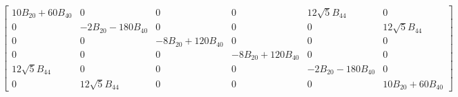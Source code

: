 \documentclass[8pt]{report}
\begin{document}
\begin{math}
\left[\begin{matrix}10 B_{20} + 60 B_{40} & 0 & 0 & 0 & 12 \sqrt{5} B_{44} & 0\\0 & - 2 B_{20} - 180 B_{40} & 0 & 0 & 0 & 12 \sqrt{5} B_{44}\\0 & 0 & - 8 B_{20} + 120 B_{40} & 0 & 0 & 0\\0 & 0 & 0 & - 8 B_{20} + 120 B_{40} & 0 & 0\\12 \sqrt{5} B_{44} & 0 & 0 & 0 & - 2 B_{20} - 180 B_{40} & 0\\0 & 12 \sqrt{5} B_{44} & 0 & 0 & 0 & 10 B_{20} + 60 B_{40}\end{matrix}\right]
\end{math}
\end{document}
